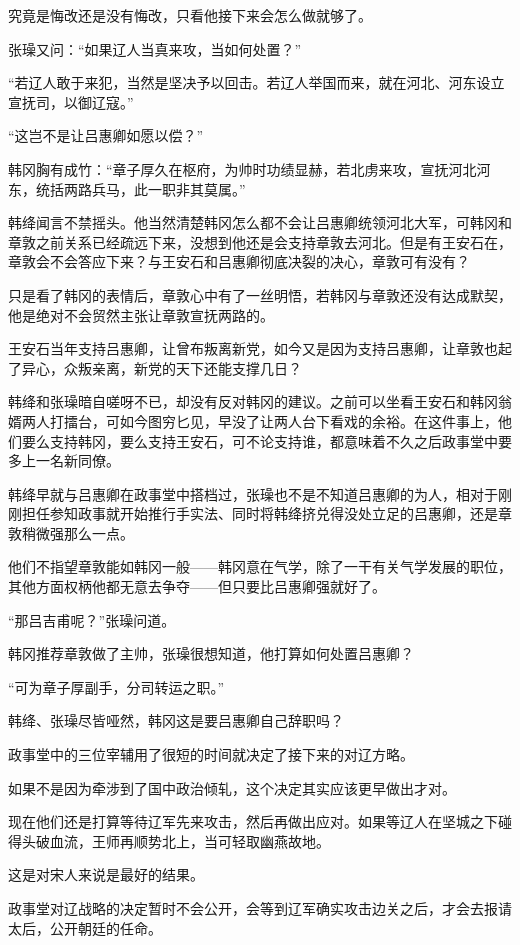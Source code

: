 究竟是悔改还是没有悔改，只看他接下来会怎么做就够了。

张璪又问：“如果辽人当真来攻，当如何处置？”

“若辽人敢于来犯，当然是坚决予以回击。若辽人举国而来，就在河北、河东设立宣抚司，以御辽寇。”

“这岂不是让吕惠卿如愿以偿？”

韩冈胸有成竹：“章子厚久在枢府，为帅时功绩显赫，若北虏来攻，宣抚河北河东，统括两路兵马，此一职非其莫属。”

韩绛闻言不禁摇头。他当然清楚韩冈怎么都不会让吕惠卿统领河北大军，可韩冈和章敦之前关系已经疏远下来，没想到他还是会支持章敦去河北。但是有王安石在，章敦会不会答应下来？与王安石和吕惠卿彻底决裂的决心，章敦可有没有？

只是看了韩冈的表情后，章敦心中有了一丝明悟，若韩冈与章敦还没有达成默契，他是绝对不会贸然主张让章敦宣抚两路的。

王安石当年支持吕惠卿，让曾布叛离新党，如今又是因为支持吕惠卿，让章敦也起了异心，众叛亲离，新党的天下还能支撑几日？

韩绛和张璪暗自嗟呀不已，却没有反对韩冈的建议。之前可以坐看王安石和韩冈翁婿两人打擂台，可如今图穷匕见，早没了让两人台下看戏的余裕。在这件事上，他们要么支持韩冈，要么支持王安石，可不论支持谁，都意味着不久之后政事堂中要多上一名新同僚。

韩绛早就与吕惠卿在政事堂中搭档过，张璪也不是不知道吕惠卿的为人，相对于刚刚担任参知政事就开始推行手实法、同时将韩绛挤兑得没处立足的吕惠卿，还是章敦稍微强那么一点。

他们不指望章敦能如韩冈一般——韩冈意在气学，除了一干有关气学发展的职位，其他方面权柄他都无意去争夺——但只要比吕惠卿强就好了。

“那吕吉甫呢？”张璪问道。

韩冈推荐章敦做了主帅，张璪很想知道，他打算如何处置吕惠卿？

“可为章子厚副手，分司转运之职。”

韩绛、张璪尽皆哑然，韩冈这是要吕惠卿自己辞职吗？

政事堂中的三位宰辅用了很短的时间就决定了接下来的对辽方略。

如果不是因为牵涉到了国中政治倾轧，这个决定其实应该更早做出才对。

现在他们还是打算等待辽军先来攻击，然后再做出应对。如果等辽人在坚城之下碰得头破血流，王师再顺势北上，当可轻取幽燕故地。

这是对宋人来说是最好的结果。

政事堂对辽战略的决定暂时不会公开，会等到辽军确实攻击边关之后，才会去报请太后，公开朝廷的任命。

